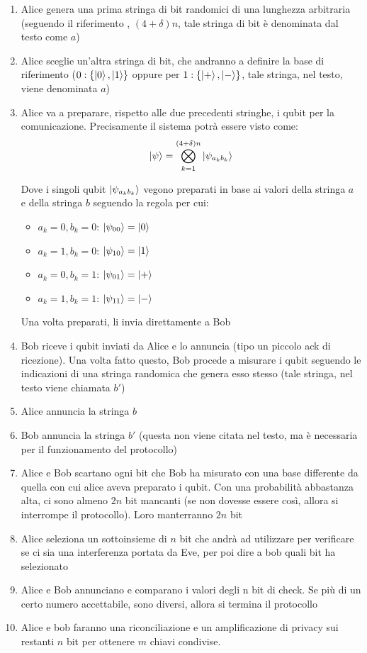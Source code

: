 \begin{enumerate}
\item Alice genera una prima stringa di bit randomici di una lunghezza arbitraria (seguendo il riferimento \cite{nielsen2010}, \((4+\delta)n\), tale stringa di bit è denominata dal testo come \(a\))
\item Alice sceglie un'altra stringa di bit, che andranno a definire la base di riferimento (\(0:\{\ket{0}, \ket{1}\}\) oppure per \(1:\{\ket{+},\ket{-}\}\), tale stringa, nel testo, viene denominata \(a\))
\item Alice va a preparare, rispetto alle due precedenti stringhe, i qubit per la comunicazione. Precisamente il sistema potrà essere visto come:
\[
\ket{\psi} = \bigotimes_{k=1}^{(4+\delta)n} \ket{\psi_{a_k b_k}}
\]

Dove i singoli qubit \(\ket{\psi_{a_k b_k}}\) vegono preparati in base ai valori della stringa \(a\) e della stringa \(b\) seguendo la regola per cui:
\begin{itemize}
    \item \(a_k=0, b_k=0\): \(\ket{\psi_{00}}=\ket{0}\)
    \item \(a_k=1, b_k=0\): \(\ket{\psi_{10}}=\ket{1}\)
    \item \(a_k=0, b_k=1\): \(\ket{\psi_{01}}=\ket{+}\)
    \item \(a_k=1, b_k=1\): \(\ket{\psi_{11}}=\ket{-}\)
\end{itemize}
Una volta preparati, li invia direttamente a Bob

\item Bob riceve i qubit inviati da Alice e lo annuncia (tipo un piccolo ack di ricezione). Una volta fatto questo, Bob procede a misurare i qubit seguendo le indicazioni di una stringa randomica che genera esso stesso (tale stringa, nel testo viene chiamata \(b'\))
\item Alice annuncia la stringa \(b\)
\item Bob annuncia la stringa \(b'\) (questa non viene citata nel testo, ma è necessaria per il funzionamento del protocollo)

\item Alice e Bob scartano ogni bit che Bob ha misurato con una base differente da quella con cui alice aveva preparato i qubit. Con una probabilità abbastanza alta, ci sono almeno \(2n\) bit mancanti (se non dovesse essere così, allora si interrompe il protocollo). Loro manterranno \(2n\) bit
\item Alice seleziona un sottoinsieme di \(n\) bit che andrà ad utilizzare per verificare se ci sia una interferenza portata da Eve, per poi dire a bob quali bit ha selezionato
\item Alice e Bob annunciano e comparano i valori degli n bit di check. Se più di un certo numero accettabile, sono diversi, allora si termina il protocollo
\item Alice e bob faranno una riconciliazione e un amplificazione di privacy sui restanti \(n\) bit per ottenere \(m\) chiavi condivise.
\end{enumerate}

